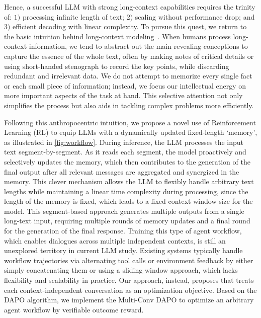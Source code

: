 Hence, a successful LLM with strong long-context capabilities requires the trinity of:
$1)$ processing infinite length of text; 
$2)$ scaling without performance drop; and $3)$ efficient decoding with linear complexity. To pursue this quest, we return to the basic intuition behind long-context modeling~\cite{miller1956magical, hochreiter1997long, graves2014neural, weston2014memory}. When humans process long-context information, we tend to abstract out the main revealing conceptions to capture the essence of the whole text, often by making notes of critical details or using short-handed stenograph to record the key points, while discarding redundant and irrelevant data. We do not attempt to memorize every single fact or each small piece of information; instead, we focus our intellectual energy on more important aspects of the task at hand. This selective attention not only simplifies the process but also aids in tackling complex problems more efficiently. 
 

Following this anthropocentric intuition, we propose a novel use of Reinforcement Learning (RL) to equip LLMs with a dynamically updated fixed-length `memory', as illustrated in \autoref{fig:workflow}. During inference, the LLM processes the input text segment-by-segment. As it reads each segment, the model proactively and selectively updates the memory, which then contributes to the generation of the final output after all relevant messages are aggregated and synergized in the memory. This clever mechanism allows the LLM to flexibly handle arbitrary text lengths while maintaining a linear time complexity during processing, since the length of the memory is fixed, which leads to a fixed context window size for the model. This segment-based approach generates multiple outputs from a single long-text input, requiring multiple rounds of memory updates and a final round for the generation of the final response. Training this type of agent workflow, which enables dialogues across multiple independent contexts, is still an unexplored territory in current LLM study. Existing systems typically handle workflow trajectories via alternating tool calls or environment feedback by either simply concatenating \cite{Agent-R1,jin2025search} them  or using a sliding window \cite{feng2025group} approach, which lacks flexibility and scalability in practice. 
Our \method approach, instead, proposes that treats each context-independent conversation as an optimization objective. Based on the DAPO\cite{yu2025dapo} algorithm, we implement the Multi-Conv DAPO to optimize an arbitrary agent workflow by verifiable outcome reward.

